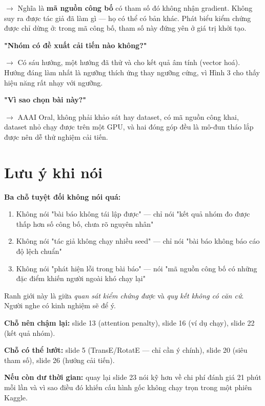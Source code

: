 \documentclass[11pt,a4paper]{article}
\begin{document}
$\rightarrow$ Nghĩa là \textbf{mã nguồn công bố} có tham số đó không nhận gradient. Không suy ra được tác giả đã làm gì --- họ có thể có bản khác. Phát biểu kiểm chứng được chỉ dừng ở: trong mã công bố, tham số này đứng yên ở giá trị khởi tạo.

\textbf{"Nhóm có đề xuất cải tiến nào không?"}

$\rightarrow$ Có sáu hướng, một hướng đã thử và cho kết quả âm tính (vector hoá). Hướng đáng làm nhất là ngưỡng thích ứng thay ngưỡng cứng, vì Hình 3 cho thấy hiệu năng rất nhạy với ngưỡng.

\textbf{"Vì sao chọn bài này?"}

$\rightarrow$ AAAI Oral, không phải khảo sát hay dataset, có mã nguồn công khai, dataset nhỏ chạy được trên một GPU, và hai đóng góp đều là mô-đun tháo lắp được nên dễ thử nghiệm cải tiến.

\section{Lưu ý khi nói}
\textbf{Ba chỗ tuyệt đối không nói quá:}

\begin{enumerate}\itemsep2pt
\item Không nói "bài báo không tái lập được" --- chỉ nói "kết quả nhóm đo được thấp hơn số công bố, chưa rõ nguyên nhân"
\item Không nói "tác giả không chạy nhiều seed" --- chỉ nói "bài báo không báo cáo độ lệch chuẩn"
\item Không nói "phát hiện lỗi trong bài báo" --- nói "mã nguồn công bố có những đặc điểm khiến người ngoài khó chạy lại"
\end{enumerate}
Ranh giới này là giữa \emph{quan sát kiểm chứng được} và \emph{quy kết không có căn cứ}. Người nghe có kinh nghiệm sẽ để ý.

\textbf{Chỗ nên chậm lại:} slide 13 (attention penalty), slide 16 (ví dụ chạy), slide 22 (kết quả nhóm).

\textbf{Chỗ có thể lướt:} slide 5 (TransE/RotatE --- chỉ cần ý chính), slide 20 (siêu tham số), slide 26 (hướng cải tiến).

\textbf{Nếu còn dư thời gian:} quay lại slide 23 nói kỹ hơn về chi phí đánh giá 21 phút mỗi lần và vì sao điều đó khiến cấu hình gốc không chạy trọn trong một phiên Kaggle.
\end{document}
